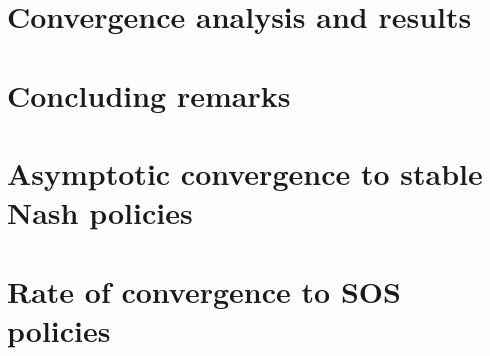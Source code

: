 \documentclass[reqno]{amsart}
\theoremstyle{plain}
\theoremstyle{definition}
\theoremstyle{remark}
\numberwithin{example}{section}		%
\begin{document}
\section{Convergence analysis and results}
\label{sec:results}



\section{Concluding remarks}
\label{sec:conclusion}




\appendix


%


\section{Asymptotic convergence to stable Nash policies}
\label{app:asymptotic}



\section{Rate of convergence to \acl{SOS} policies}
\label{app:SOS}

\end{document}
